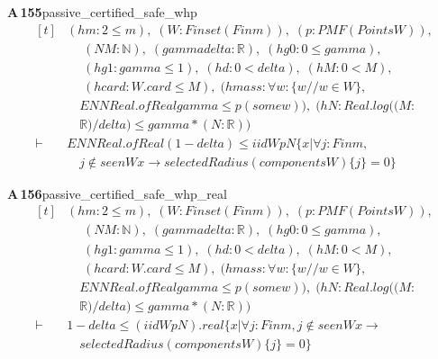 \documentclass[conference]{IEEEtran}
\theoremstyle{definition}
\newcommand{\lean}[1]{\textsf{\footnotesize #1}}
\begin{document}
\noindent\textbf{A\,155}\quad\lean{passive\_certified\_safe\_whp}
{\footnotesize\[ \begin{aligned}[t]
&(\mathit{hm} : 2 \leq \mathit{m}),\; (\mathit{W} : \mathit{Finset} (\mathit{Fin} \mathit{m})),\; (\mathit{p} : \mathit{PMF} (\mathit{Points} \mathit{W})),\\
&\quad \; (\mathit{N} \mathit{M} : \mathbb{N} ),\; (\mathit{gamma} \mathit{delta} : \mathbb{R} ),\; (\mathit{hg0} : 0 \leq \mathit{gamma}),\\
&\quad \; (\mathit{hg1} : \mathit{gamma} \leq 1),\; (\mathit{hd} : 0 < \mathit{delta}),\; (\mathit{hM} : 0 < \mathit{M}),\\
&\quad \; (\mathit{hcard} : \mathit{W}.\mathit{card} \leq \mathit{M}),\; (\mathit{hmass} : \forall \mathit{w} : \{ \mathit{w} // \mathit{w} \in \mathit{W}\} ,\\
&\quad \mathit{ENNReal}.\mathit{ofReal} \mathit{gamma} \leq \mathit{p} (\mathit{some} \mathit{w})),\; (\mathit{hN} : \mathit{Real}.\mathit{log} ((\mathit{M}:\\
&\quad \mathbb{R} )/\mathit{delta}) \leq \mathit{gamma}*(\mathit{N}:\mathbb{R} ))\\
\vdash\;&\mathit{ENNReal}.\mathit{ofReal} (1-\mathit{delta}) \leq \mathit{iid} \mathit{W} \mathit{p} \mathit{N} \{ \mathit{x} | \forall \mathit{j} : \mathit{Fin} \mathit{m},\\
&\quad \mathit{j} \notin \mathit{seen} \mathit{W} \mathit{x} \to \mathit{selectedRadius} (\mathit{components} \mathit{W}) \{ \mathit{j}\} = 0\}
\end{aligned} \]}

\noindent\textbf{A\,156}\quad\lean{passive\_certified\_safe\_whp\_real}
{\footnotesize\[ \begin{aligned}[t]
&(\mathit{hm} : 2 \leq \mathit{m}),\; (\mathit{W} : \mathit{Finset} (\mathit{Fin} \mathit{m})),\; (\mathit{p} : \mathit{PMF} (\mathit{Points} \mathit{W})),\\
&\quad \; (\mathit{N} \mathit{M} : \mathbb{N} ),\; (\mathit{gamma} \mathit{delta} : \mathbb{R} ),\; (\mathit{hg0} : 0 \leq \mathit{gamma}),\\
&\quad \; (\mathit{hg1} : \mathit{gamma} \leq 1),\; (\mathit{hd} : 0 < \mathit{delta}),\; (\mathit{hM} : 0 < \mathit{M}),\\
&\quad \; (\mathit{hcard} : \mathit{W}.\mathit{card} \leq \mathit{M}),\; (\mathit{hmass} : \forall \mathit{w} : \{ \mathit{w} // \mathit{w} \in \mathit{W}\} ,\\
&\quad \mathit{ENNReal}.\mathit{ofReal} \mathit{gamma} \leq \mathit{p} (\mathit{some} \mathit{w})),\; (\mathit{hN} : \mathit{Real}.\mathit{log} ((\mathit{M}:\\
&\quad \mathbb{R} )/\mathit{delta}) \leq \mathit{gamma}*(\mathit{N}:\mathbb{R} ))\\
\vdash\;&1 - \mathit{delta} \leq (\mathit{iid} \mathit{W} \mathit{p} \mathit{N}).\mathit{real} \{ \mathit{x} | \forall \mathit{j} : \mathit{Fin} \mathit{m}, \mathit{j} \notin \mathit{seen} \mathit{W} \mathit{x} \to\\
&\quad \mathit{selectedRadius} (\mathit{components} \mathit{W}) \{ \mathit{j}\} = 0\}
\end{aligned} \]}
\end{document}
